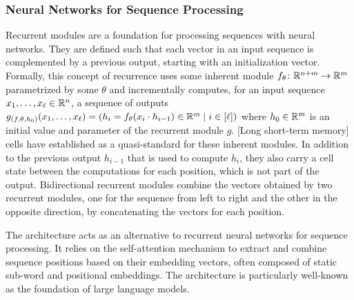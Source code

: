 \documentclass[../document.tex]{subfiles}
\begin{document}
    \subsubsection{Neural Networks for Sequence Processing}\label{sec:preliminaries:nn:recurrent}
    Recurrent modules are a foundation for processing sequences with neural networks.
    They are defined such that each vector in an input sequence is complemented by a previous output, starting with an initialization vector.
    Formally, this concept of recurrence uses some inherent module \(f_\theta\colon \mathbb{R}^{n+m} \to \mathbb{R}^m\) parametrized by some \(\theta\) and incrementally computes, for an input sequence \(x_1, \ldots, x_\ell \in \mathbb{R}^n\), a sequence of outputs \(g_{(f, \theta, h_0)}(x_1, \ldots, x_\ell) = (h_i = f_\theta(x_i \cdot h_{i-1}) \in \mathbb{R}^m \mid i \in [\ell])\) where \(h_0 \in \mathbb{R}^m\) is an initial value and parameter of the recurrent module \(g\).
    [Long short-term memory]  cells \citep{Hoc97} have established as a quasi-standard for these inherent modules.
    In addition to the previous output \(h_{i-1}\) that is used to compute \(h_i\), they also carry a cell state between the computations for each position, which is not part of the output.
    Bidirectional recurrent modules combine the vectors obtained by two recurrent modules, one for the sequence from left to right and the other in the opposite direction, by concatenating the vectors for each position.

    The  architecture \citep{vaswani2017attention} acts as an alternative to recurrent neural networks for sequence processing.
    It relies on the self-attention mechanism to extract and combine sequence positions based on their embedding vectors, often composed of static sub-word and positional embeddings.
    The architecture is particularly well-known as the foundation of large language models.
\end{document}
